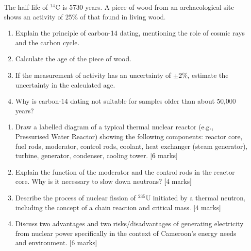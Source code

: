 \documentclass[11pt]{article}
\newcounter{popsec}
\newcounter{popsub}
\newcommand{\courssub}[1]{%
  \stepcounter{popsub}%
  \par\vspace{9pt}\noindent{\popxbold\fontsize{11.5}{13}\selectfont\color{popink}{\color{poporange}\thepopsec.\thepopsub}\hspace{6pt}#1}\par\nopagebreak\vspace{4pt}
}
\begin{document}
\begin{exercice}
The half-life of $^{14}\text{C}$ is 5730 years. A piece of wood from an archaeological site shows an activity of 25\% of that found in living wood.
\begin{enumerate}
    \item Explain the principle of carbon-14 dating, mentioning the role of cosmic rays and the carbon cycle.
    \item Calculate the age of the piece of wood.
    \item If the measurement of activity has an uncertainty of $\pm 2\%$, estimate the uncertainty in the calculated age.
    \item Why is carbon-14 dating not suitable for samples older than about 50,000 years?
\end{enumerate}
\end{exercice}

\courssub{I prepare for the GCE}

\begin{exercice}
\begin{enumerate}
    \item Draw a labelled diagram of a typical thermal nuclear reactor (e.g., Pressurised Water Reactor) showing the following components: reactor core, fuel rods, moderator, control rods, coolant, heat exchanger (steam generator), turbine, generator, condenser, cooling tower. [6 marks]
    \item Explain the function of the moderator and the control rods in the reactor core. Why is it necessary to slow down neutrons? [4 marks]
    \item Describe the process of nuclear fission of $^{235}\text{U}$ initiated by a thermal neutron, including the concept of a chain reaction and critical mass. [4 marks]
    \item Discuss two advantages and two risks/disadvantages of generating electricity from nuclear power specifically in the context of Cameroon's energy needs and environment. [6 marks]
\end{enumerate}
\end{exercice}
\end{document}

